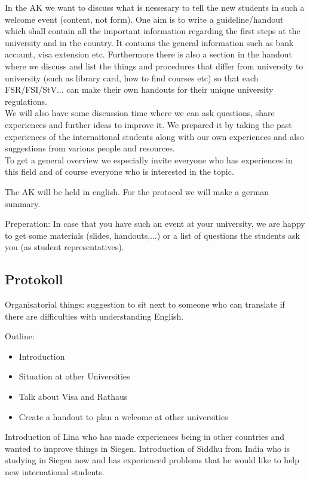     In the AK we want to discuss what is nessesary to tell the new students in such a welcome event (content, not form).
    One aim is to write a guideline/handout which shall contain all the important information regarding the first steps
    at the university and in the country. It contains the general information such as bank account, visa extension etc.
    Furthermore there is also a section in the handout where we discuss and list the things and procedures that
    differ from university to university (such as library card, how to find courses etc) so that each FSR/FSI/StV...
    can make their own handouts for their unique university regulations. \\

    We will also have some discussion time where we can ask questions, share experiences and further ideas
    to improve it. We prepared it by taking the past experiences of the internaitonal students
    along with our own experiences and also suggestions from various people and resources. \\

    To get a general overview we especially invite everyone who has experiences in this field and of course
    everyone who is interested in the topic.

    The AK will be held in english. For the protocol we will make a german summary.

    Preperation:
    In case that you have such an event at your university, we are happy to get some materials (slides, handouts,...)
    or a list of questions the students ask you (as student representatives).

  \subsection*{Protokoll}
    Organisatorial things: suggestion to sit next to someone who can translate if there are difficulties with understanding English.

    Outline:
    \begin{itemize}
      \item Introduction
      \item Situation at other Universities
      \item Talk about Visa and Rathaus
      \item Create a handout to plan a welcome at other universities
    \end{itemize}

    Introduction of Lina who has made experiences being in other countries and wanted to improve things in Siegen.
    Introduction of Siddhu from India who is studying in Siegen now and has experienced problems that he would like to help new international students.

